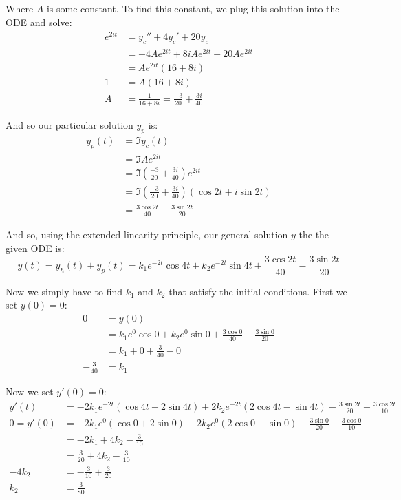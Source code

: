 \documentclass{article}
\begin{document}
Where $A$ is some constant. To find this constant, we plug this solution into the ODE and solve:
\begin{align*}
  e^{2it}&=y_c''+4y_c'+20y_c\\
  &=-4Ae^{2it}+8iAe^{2it}+20Ae^{2it}\\
  &=Ae^{2it}(16+8i)\\
  1&=A(16+8i)\\
  A&=\frac{1}{16+8i}=\frac{-3}{20}+\frac{3i}{40}
\end{align*}

And so our particular solution $y_p$ is:
\begin{align*}
  y_p(t)&=\Im{y_c(t)}\\
  &=\Im{Ae^{2it}}\\
  &=\Im{\left(\frac{-3}{20}+\frac{3i}{40}\right)e^{2it}}\\
  &=\Im{\left(\frac{-3}{20}+\frac{3i}{40}\right)(\cos 2t+i\sin2t)}\\
  &=\frac{3\cos 2t}{40}-\frac{3\sin2t}{20}
\end{align*}

And so, using the extended linearity principle, our general solution $y$ the the given ODE is:
\begin{equation*}
  y(t)=y_h(t)+y_p(t)=k_1e^{-2t}\cos 4t+k_2e^{-2t}\sin4t+\frac{3\cos 2t}{40}-\frac{3\sin2t}{20}
\end{equation*}

Now we simply have to find $k_1$ and $k_2$ that satisfy the initial conditions. First we set $y(0)=0$:
\begin{align*}
  0&=y(0)\\
  &=k_1e^{0}\cos 0+k_2e^{0}\sin0+\frac{3\cos 0}{40}-\frac{3\sin0}{20}\\
  &=k_1+0+\frac{3}{40}-0\\
  -\frac{3}{40}&=k_1
\end{align*}

Now we set $y'(0)=0$:
\begin{align*}
  y'(t)&=-2k_1e^{-2t}(\cos 4t + 2\sin 4t)+2k_2e^{-2t}(2\cos 4t-\sin 4t)-\frac{3\sin 2t}{20}-\frac{3\cos2t}{10}\\
  0=y'(0)&=-2k_1e^{0}(\cos 0 + 2\sin 0)+2k_2e^{0}(2\cos 0-\sin 0)-\frac{3\sin 0}{20}-\frac{3\cos0}{10}\\
  &=-2k_1+4k_2-\frac{3}{10}\\
  &=\frac{3}{20}+4k_2-\frac{3}{10}\\
  -4k_2&=-\frac{3}{10}+\frac{3}{20}\\
  k_2&=\frac{3}{80}
\end{align*}
\end{document}
